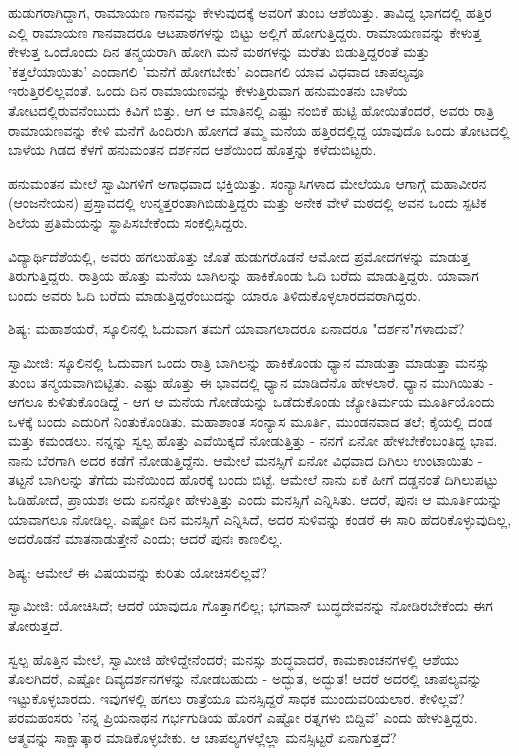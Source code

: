 ಹುಡುಗರಾಗಿದ್ದಾಗ, ರಾಮಾಯಣ ಗಾನವನ್ನು ಕೇಳುವುದಕ್ಕೆ ಅವರಿಗೆ ತುಂಬ ಆಶೆಯಿತ್ತು. ತಾವಿದ್ದ ಭಾಗದಲ್ಲಿ ಹತ್ತಿರ ಎಲ್ಲಿ ರಾಮಾಯಣ ಗಾನವಾದರೂ ಆಟಪಾಠಗಳನ್ನು ಬಿಟ್ಟು ಅಲ್ಲಿಗೆ ಹೋಗುತ್ತಿದ್ದರು. ರಾಮಾಯಣವನ್ನು ಕೇಳುತ್ತ ಕೇಳುತ್ತ ಒಂದೊಂದು ದಿನ ತನ್ಮಯರಾಗಿ ಹೋಗಿ ಮನೆ ಮಠಗಳನ್ನು ಮರೆತು ಬಿಡುತ್ತಿದ್ದರಂತೆ ಮತ್ತು 'ಕತ್ತಲೆಯಾಯಿತು' ಎಂದಾಗಲಿ 'ಮನೆಗೆ ಹೋಗಬೇಕು' ಎಂದಾಗಲಿ ಯಾವ ವಿಧವಾದ ಚಾಪಲ್ಯವೂ ಇರುತ್ತಿರಲಿಲ್ಲವಂತೆ. ಒಂದು ದಿನ ರಾಮಾಯಣವನ್ನು ಕೇಳುತ್ತಿರುವಾಗ ಹನುಮಂತನು ಬಾಳೆಯ ತೋಟದಲ್ಲಿರುವನೆಂಬುದು ಕಿವಿಗೆ ಬಿತ್ತು. ಆಗ ಆ ಮಾತಿನಲ್ಲಿ ಎಷ್ಟು ನಂಬಿಕೆ ಹುಟ್ಟಿ ಹೋಯಿತೆಂದರೆ, ಅವರು ರಾತ್ರಿ ರಾಮಾಯಣವನ್ನು ಕೇಳಿ ಮನೆಗೆ ಹಿಂದಿರುಗಿ ಹೋಗದೆ ತಮ್ಮ ಮನೆಯ ಹತ್ತಿರದಲ್ಲಿದ್ದ ಯಾವುದೊ ಒಂದು ತೋಟದಲ್ಲಿ ಬಾಳೆಯ ಗಿಡದ ಕೆಳಗೆ ಹನುಮಂತನ ದರ್ಶನದ ಆಶೆಯಿಂದ ಹೊತ್ತನ್ನು ಕಳೆದುಬಿಟ್ಟರು.

ಹನುಮಂತನ ಮೇಲೆ ಸ್ವಾಮಿಗಳಿಗೆ ಅಗಾಧವಾದ ಭಕ್ತಿಯಿತ್ತು. ಸಂನ್ಯಾಸಿಗಳಾದ ಮೇಲೆಯೂ ಆಗಾಗ್ಗೆ ಮಹಾವೀರನ (ಆಂಜನೇಯನ) ಪ್ರಸ್ತಾವದಲ್ಲಿ ಉನ್ಮತ್ತರಂತಾಗಿಬಿಡುತ್ತಿದ್ದರು ಮತ್ತು ಅನೇಕ ವೇಳೆ ಮಠದಲ್ಲಿ ಅವನ ಒಂದು ಸ್ಪಟಿಕ ಶಿಲೆಯ ಪ್ರತಿಮೆಯನ್ನು ಸ್ಥಾಪಿಸಬೇಕೆಂದು ಸಂಕಲ್ಪಿಸಿದ್ದರು.

ವಿದ್ಯಾರ್ಥಿದೆಶೆಯಲ್ಲಿ, ಅವರು ಹಗಲುಹೊತ್ತು ಜೊತೆ ಹುಡುಗರೊಡನೆ ಆಮೋದ ಪ್ರಮೋದಗಳನ್ನು ಮಾಡುತ್ತ ತಿರುಗುತ್ತಿದ್ದರು. ರಾತ್ರಿಯ ಹೊತ್ತು ಮನೆಯ ಬಾಗಿಲನ್ನು ಹಾಕಿಕೊಂಡು ಓದಿ ಬರೆದು ಮಾಡುತ್ತಿದ್ದರು. ಯಾವಾಗ ಬಂದು ಅವರು ಓದಿ ಬರೆದು ಮಾಡುತ್ತಿದ್ದರೆಂಬುದನ್ನು ಯಾರೂ ತಿಳಿದುಕೊಳ್ಳಲಾರದವರಾಗಿದ್ದರು.

\delimiter

ಶಿಷ್ಯ: ಮಹಾಶಯರೆ, ಸ್ಕೂಲಿನಲ್ಲಿ ಓದುವಾಗ ತಮಗೆ ಯಾವಾಗಲಾದರೂ ಏನಾದರೂ "ದರ್ಶನ"ಗಳಾದುವೆ?

ಸ್ವಾಮೀಜಿ: ಸ್ಕೂಲಿನಲ್ಲಿ ಓದುವಾಗ ಒಂದು ರಾತ್ರಿ ಬಾಗಿಲನ್ನು ಹಾಕಿಕೊಂಡು ಧ್ಯಾನ ಮಾಡುತ್ತಾ ಮಾಡುತ್ತಾ ಮನಸ್ಸು ತುಂಬ ತನ್ಮಯವಾಗಿಬಿಟ್ಟಿತು. ಎಷ್ಟು ಹೊತ್ತು ಈ ಭಾವದಲ್ಲಿ ಧ್ಯಾನ ಮಾಡಿದೆನೊ ಹೇಳಲಾರೆ. ಧ್ಯಾನ ಮುಗಿಯಿತು - ಆಗಲೂ ಕುಳಿತುಕೊಂಡಿದ್ದೆ - ಆಗ ಆ ಮನೆಯ ಗೋಡೆಯನ್ನು ಒಡೆದುಕೊಂಡು ಜ್ಯೋತಿರ್ಮಯ ಮೂರ್ತಿಯೊಂದು ಒಳಕ್ಕೆ ಬಂದು ಎದುರಿಗೆ ನಿಂತುಕೊಂಡಿತು. ಮಹಾಶಾಂತ ಸಂನ್ಯಾಸ ಮೂರ್ತಿ, ಮುಂಡನವಾದ ತಲೆ; ಕೈಯಲ್ಲಿ ದಂಡ ಮತ್ತು ಕಮಂಡಲು. ನನ್ನನ್ನು ಸ್ವಲ್ಪ ಹೊತ್ತು ಎವೆಯಿಕ್ಕದೆ ನೋಡುತ್ತಿತ್ತು - ನನಗೆ ಏನೋ ಹೇಳಬೇಕೆಂಬಂತಿದ್ದ ಭಾವ. ನಾನು ಬೆರಗಾಗಿ ಅದರ ಕಡೆಗೆ ನೋಡುತ್ತಿದ್ದೆನು. ಆಮೇಲೆ ಮನಸ್ಸಿಗೆ ಏನೋ ವಿಧವಾದ ದಿಗಿಲು ಉಂಟಾಯಿತು - ತಟ್ಟನೆ ಬಾಗಿಲನ್ನು ತೆಗೆದು ಮನೆಯಿಂದ ಹೊರಕ್ಕೆ ಬಂದು ಬಿಟ್ಟೆ. ಆಮೇಲೆ ನಾನು ಏಕೆ ಹೀಗೆ ದಡ್ಡನಂತೆ ದಿಗಿಲುಪಟ್ಟು ಓಡಿಹೋದೆ, ಪ್ರಾಯಶಃ ಅದು ಏನನ್ನೋ ಹೇಳುತ್ತಿತ್ತು ಎಂದು ಮನಸ್ಸಿಗೆ ಎನ್ನಿಸಿತು. ಆದರೆ, ಪುನಃ ಆ ಮೂರ್ತಿಯನ್ನು ಯಾವಾಗಲೂ ನೋಡಿಲ್ಲ. ಎಷ್ಟೋ ದಿನ ಮನಸ್ಸಿಗೆ ಎನ್ನಿಸಿದೆ, ಅದರ ಸುಳಿವನ್ನು ಕಂಡರೆ ಈ ಸಾರಿ ಹೆದರಿಕೊಳ್ಳುವುದಿಲ್ಲ, ಅದರೊಡನೆ ಮಾತನಾಡುತ್ತೇನೆ ಎಂದು; ಆದರೆ ಪುನಃ ಕಾಣಲಿಲ್ಲ.

ಶಿಷ್ಯ: ಆಮೇಲೆ ಈ ವಿಷಯವನ್ನು ಕುರಿತು ಯೋಚಿಸಲಿಲ್ಲವೆ?

ಸ್ವಾಮೀಜಿ: ಯೋಚಿಸಿದೆ; ಆದರೆ ಯಾವುದೂ ಗೊತ್ತಾಗಲಿಲ್ಲ; ಭಗವಾನ್ ಬುದ್ಧದೇವನನ್ನು ನೋಡಿರಬೇಕೆಂದು ಈಗ ತೋರುತ್ತದೆ.

ಸ್ವಲ್ಪ ಹೊತ್ತಿನ ಮೇಲೆ, ಸ್ವಾಮೀಜಿ ಹೇಳಿದ್ದೇನೆಂದರೆ; ಮನಸ್ಸು ಶುದ್ಧವಾದರೆ, ಕಾಮಕಾಂಚನಗಳಲ್ಲಿ ಆಶೆಯು ತೊಲಗಿದರೆ, ಎಷ್ಟೋ ದಿವ್ಯದರ್ಶನಗಳನ್ನು ನೋಡಬಹುದು - ಅದ್ಭುತ, ಅದ್ಭುತ! ಆದರೆ ಅದರಲ್ಲಿ ಚಾಪಲ್ಯವನ್ನು ಇಟ್ಟುಕೊಳ್ಳಬಾರದು. ಇವುಗಳಲ್ಲಿ ಹಗಲು ರಾತ್ರೆಯೂ ಮನಸ್ಸಿದ್ದರೆ ಸಾಧಕ ಮುಂದುವರಿಯಲಾರ. ಕೇಳಿಲ್ಲವೆ? ಪರಮಹಂಸರು 'ನನ್ನ ಪ್ರಿಯನಾಥನ ಗರ್ಭಗುಡಿಯ ಹೊರಗೆ ಎಷ್ಟೋ ರತ್ನಗಳು ಬಿದ್ದಿವೆ' ಎಂದು ಹೇಳುತ್ತಿದ್ದರು. ಆತ್ಮವನ್ನು ಸಾಕ್ಷಾತ್ಕಾರ ಮಾಡಿಕೊಳ್ಳಬೇಕು. ಆ ಚಾಪಲ್ಯಗಳಲ್ಲೆಲ್ಲಾ ಮನಸ್ಸಿಟ್ಟರೆ ಏನಾಗುತ್ತದೆ?

